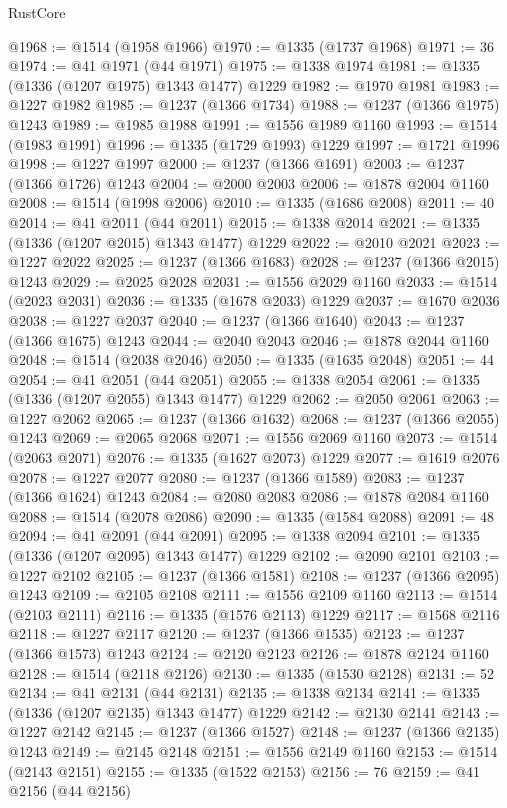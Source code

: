 \begin{lexlean}{RustCore}
\begin{coremodule}
@1968 := @1514 (@1958 @1966)
@1970 := @1335 (@1737 @1968)
@1971 := 36
@1974 := @41 @1971 (@44 @1971)
@1975 := @1338 @1974
@1981 := @1335 (@1336 (@1207 @1975) @1343 @1477) @1229
@1982 := @1970 @1981
@1983 := @1227 @1982
@1985 := @1237 (@1366 @1734)
@1988 := @1237 (@1366 @1975) @1243
@1989 := @1985 @1988
@1991 := @1556 @1989 @1160
@1993 := @1514 (@1983 @1991)
@1996 := @1335 (@1729 @1993) @1229
@1997 := @1721 @1996
@1998 := @1227 @1997
@2000 := @1237 (@1366 @1691)
@2003 := @1237 (@1366 @1726) @1243
@2004 := @2000 @2003
@2006 := @1878 @2004 @1160
@2008 := @1514 (@1998 @2006)
@2010 := @1335 (@1686 @2008)
@2011 := 40
@2014 := @41 @2011 (@44 @2011)
@2015 := @1338 @2014
@2021 := @1335 (@1336 (@1207 @2015) @1343 @1477) @1229
@2022 := @2010 @2021
@2023 := @1227 @2022
@2025 := @1237 (@1366 @1683)
@2028 := @1237 (@1366 @2015) @1243
@2029 := @2025 @2028
@2031 := @1556 @2029 @1160
@2033 := @1514 (@2023 @2031)
@2036 := @1335 (@1678 @2033) @1229
@2037 := @1670 @2036
@2038 := @1227 @2037
@2040 := @1237 (@1366 @1640)
@2043 := @1237 (@1366 @1675) @1243
@2044 := @2040 @2043
@2046 := @1878 @2044 @1160
@2048 := @1514 (@2038 @2046)
@2050 := @1335 (@1635 @2048)
@2051 := 44
@2054 := @41 @2051 (@44 @2051)
@2055 := @1338 @2054
@2061 := @1335 (@1336 (@1207 @2055) @1343 @1477) @1229
@2062 := @2050 @2061
@2063 := @1227 @2062
@2065 := @1237 (@1366 @1632)
@2068 := @1237 (@1366 @2055) @1243
@2069 := @2065 @2068
@2071 := @1556 @2069 @1160
@2073 := @1514 (@2063 @2071)
@2076 := @1335 (@1627 @2073) @1229
@2077 := @1619 @2076
@2078 := @1227 @2077
@2080 := @1237 (@1366 @1589)
@2083 := @1237 (@1366 @1624) @1243
@2084 := @2080 @2083
@2086 := @1878 @2084 @1160
@2088 := @1514 (@2078 @2086)
@2090 := @1335 (@1584 @2088)
@2091 := 48
@2094 := @41 @2091 (@44 @2091)
@2095 := @1338 @2094
@2101 := @1335 (@1336 (@1207 @2095) @1343 @1477) @1229
@2102 := @2090 @2101
@2103 := @1227 @2102
@2105 := @1237 (@1366 @1581)
@2108 := @1237 (@1366 @2095) @1243
@2109 := @2105 @2108
@2111 := @1556 @2109 @1160
@2113 := @1514 (@2103 @2111)
@2116 := @1335 (@1576 @2113) @1229
@2117 := @1568 @2116
@2118 := @1227 @2117
@2120 := @1237 (@1366 @1535)
@2123 := @1237 (@1366 @1573) @1243
@2124 := @2120 @2123
@2126 := @1878 @2124 @1160
@2128 := @1514 (@2118 @2126)
@2130 := @1335 (@1530 @2128)
@2131 := 52
@2134 := @41 @2131 (@44 @2131)
@2135 := @1338 @2134
@2141 := @1335 (@1336 (@1207 @2135) @1343 @1477) @1229
@2142 := @2130 @2141
@2143 := @1227 @2142
@2145 := @1237 (@1366 @1527)
@2148 := @1237 (@1366 @2135) @1243
@2149 := @2145 @2148
@2151 := @1556 @2149 @1160
@2153 := @1514 (@2143 @2151)
@2155 := @1335 (@1522 @2153)
@2156 := 76
@2159 := @41 @2156 (@44 @2156)

\end{coremodule}
\end{lexlean}
